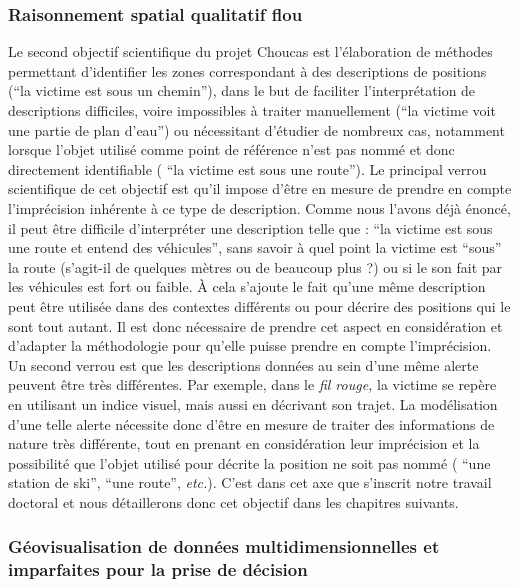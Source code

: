 \subsubsection{Raisonnement spatial qualitatif flou}
\label{subsec:1-2-3-2}

Le second objectif scientifique du projet Choucas est l’élaboration de
méthodes permettant d'identifier les zones correspondant à des
descriptions de positions (\eg \enquote{la victime est sous un
  chemin}), dans le but de faciliter l'interprétation de descriptions
difficiles, voire impossibles à traiter manuellement (\eg \enquote{la
  victime voit une partie de plan d'eau}) ou nécessitant d'étudier de
nombreux cas, notamment lorsque l'objet utilisé comme point de
référence n'est pas nommé et donc directement identifiable (\eg
\enquote{la victime est sous une route}). Le principal verrou
scientifique de cet objectif est qu'il impose d'être en mesure de
prendre en compte l'imprécision inhérente à ce type de
description. Comme nous l'avons déjà énoncé, il peut être difficile
d'interpréter une description telle que : \enquote{la victime est sous
  une route et entend des véhicules}, sans savoir à quel point la
victime est \enquote{sous} la route (s'agit-il de quelques mètres ou
de beaucoup plus ?) ou si le son fait par les véhicules est fort ou
faible. À cela s'ajoute le fait qu'une même description peut être
utilisée dans des contextes différents ou pour décrire des positions
qui le sont tout autant. Il est donc nécessaire de prendre cet aspect
en considération et d'adapter la méthodologie pour qu'elle puisse
prendre en compte l'imprécision. Un second verrou est que les
descriptions données au sein d'une même alerte peuvent être très
différentes. Par exemple, dans le \emph{fil rouge,} la victime se
repère en utilisant un indice visuel, mais aussi en décrivant son
trajet. La modélisation d'une telle alerte nécessite donc d'être en
mesure de traiter des informations de nature très différente, tout en
prenant en considération leur imprécision et la possibilité que
l'objet utilisé pour décrite la position ne soit pas nommé (\eg
\enquote{une station de ski}, \enquote{une route}, \emph{etc.}). C'est
dans cet axe que s'inscrit notre travail doctoral et nous détaillerons
donc cet objectif dans les chapitres suivants.

\subsubsection{Géovisualisation de données multidimensionnelles et
  imparfaites pour la prise de décision}
\label{subsec:1-2-3-3}

